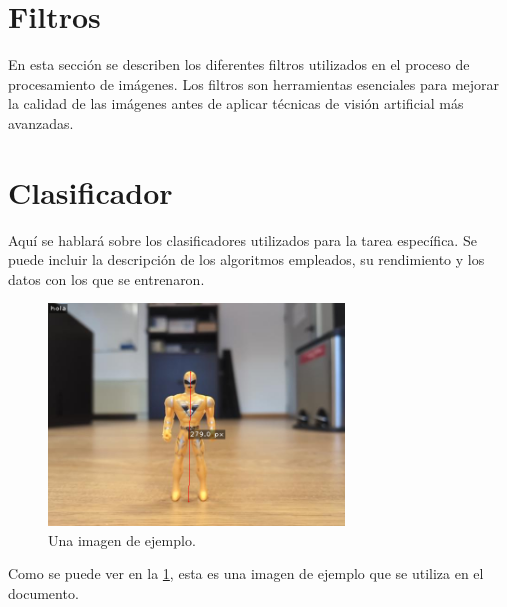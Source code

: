 \documentclass[12pt]{article}
\begin{document}
\newpage

\section{Filtros}
En esta sección se describen los diferentes filtros utilizados en el proceso de procesamiento de imágenes. Los filtros son herramientas esenciales para mejorar la calidad de las imágenes antes de aplicar técnicas de visión artificial más avanzadas.



\newpage

\section{Clasificador}
Aquí se hablará sobre los clasificadores utilizados para la tarea específica. Se puede incluir la descripción de los algoritmos empleados, su rendimiento y los datos con los que se entrenaron.


\begin{figure}[h!]
    \centering
    \includegraphics[width=0.7\textwidth]{images_calibracion/Altura_objeto.png} 
    \caption{Una imagen de ejemplo.}
    \label{fig:imagen_ejemplo}
\end{figure}

Como se puede ver en la \ref{fig:imagen_ejemplo}, esta es una imagen de ejemplo que se utiliza en el documento.
\end{document}
